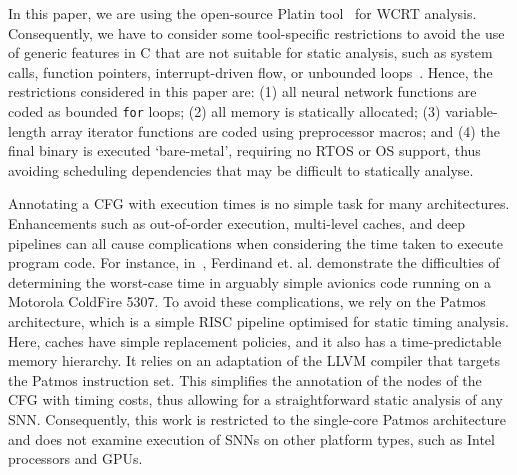 In this paper, we are using the open-source Platin
tool~\cite{compiler:platin:kps15} for \ac{WCRT}
analysis. Consequently, we have to consider some tool-specific
restrictions to avoid the use of generic features in C that are not
suitable for static analysis, such as system calls, function pointers, interrupt-driven flow, or unbounded loops~\cite{RTOSWCET}.
Hence, the restrictions considered in this paper are: (1) all neural
network functions are coded as bounded \texttt{for} loops; (2) all
memory is statically allocated; (3) variable-length array iterator
functions are coded using preprocessor macros; and (4) the final binary is executed `bare-metal', requiring no
RTOS or OS support, thus avoiding scheduling dependencies
that may be difficult to statically analyse.

Annotating a \ac{CFG} with execution times is no simple task for many architectures.
Enhancements such as out-of-order execution, multi-level caches, and deep pipelines can all cause complications when considering the time taken to execute program code.
For instance, in~\cite{AirplaneWcet}, Ferdinand et. al. demonstrate the difficulties of determining the worst-case time in arguably simple avionics code running on a Motorola ColdFire 5307.
To avoid these complications, we rely on the Patmos~\cite{patmos:ppes2011} architecture, which is a simple RISC pipeline optimised for static timing analysis. 
Here, caches have simple replacement policies, and it also has a time-predictable memory hierarchy.
It relies on an adaptation of the LLVM compiler that targets the Patmos instruction set.
This simplifies the annotation of the nodes of the \ac{CFG} with
timing costs, thus allowing for a straightforward static analysis of any
\ac{SNN}. Consequently, this work is restricted to the single-core
Patmos architecture and does not examine execution of \acp{SNN} on
other platform types, such as Intel processors and GPUs.

